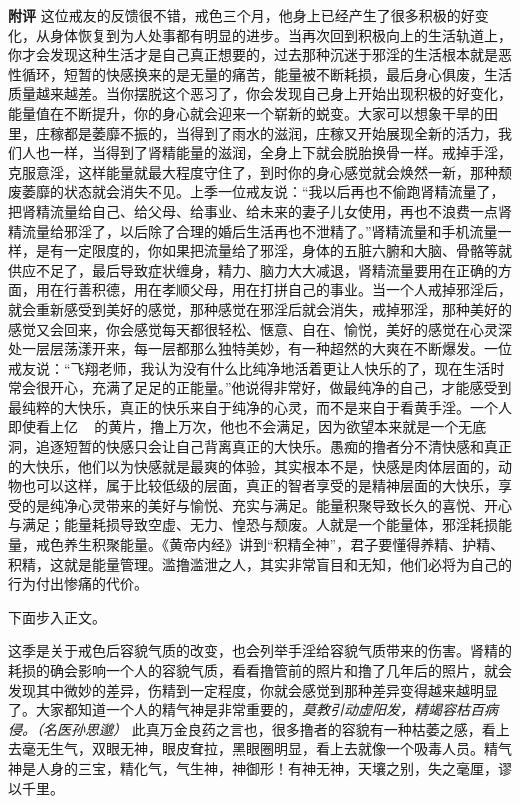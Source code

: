 \begin{case}
    \textbf{附评} 这位戒友的反馈很不错，戒色三个月，他身上已经产生了很多积极的好变化，从身体恢复到为人处事都有明显的进步。当再次回到积极向上的生活轨道上，你才会发现这种生活才是自己真正想要的，过去那种沉迷于邪淫的生活根本就是恶性循环，短暂的快感换来的是无量的痛苦，能量被不断耗损，最后身心俱废，生活质量越来越差。当你摆脱这个恶习了，你会发现自己身上开始出现积极的好变化，能量值在不断提升，你的身心就会迎来一个崭新的蜕变。大家可以想象干旱的田里，庄稼都是萎靡不振的，当得到了雨水的滋润，庄稼又开始展现全新的活力，我们人也一样，当得到了肾精能量的滋润，全身上下就会脱胎换骨一样。戒掉手淫，克服意淫，这样能量就最大程度守住了，到时你的身心感觉就会焕然一新，那种颓废萎靡的状态就会消失不见。上季一位戒友说：“我以后再也不偷跑肾精流量了，把肾精流量给自己、给父母、给事业、给未来的妻子儿女使用，再也不浪费一点肾精流量给邪淫了，以后除了合理的婚后生活再也不泄精了。”肾精流量和手机流量一样，是有一定限度的，你如果把流量给了邪淫，身体的五脏六腑和大脑、骨骼等就供应不足了，最后导致症状缠身，精力、脑力大大减退，肾精流量要用在正确的方面，用在行善积德，用在孝顺父母，用在打拼自己的事业。当一个人戒掉邪淫后，就会重新感受到美好的感觉，那种感觉在邪淫后就会消失，戒掉邪淫，那种美好的感觉又会回来，你会感觉每天都很轻松、惬意、自在、愉悦，美好的感觉在心灵深处一层层荡漾开来，每一层都那么独特美妙，有一种超然的大爽在不断爆发。一位戒友说：“飞翔老师，我认为没有什么比纯净地活着更让人快乐的了，现在生活时常会很开心，充满了足足的正能量。”他说得非常好，做最纯净的自己，才能感受到最纯粹的大快乐，真正的快乐来自于纯净的心灵，而不是来自于看黄手淫。一个人即使看上亿 \unit{\giga\byte} 的黄片，撸上万次，他也不会满足，因为欲望本来就是一个无底洞，追逐短暂的快感只会让自己背离真正的大快乐。愚痴的撸者分不清快感和真正的大快乐，他们以为快感就是最爽的体验，其实根本不是，快感是肉体层面的，动物也可以这样，属于比较低级的层面，真正的智者享受的是精神层面的大快乐，享受的是纯净心灵带来的美好与愉悦、充实与满足。能量积聚导致长久的喜悦、开心与满足；能量耗损导致空虚、无力、惶恐与颓废。人就是一个能量体，邪淫耗损能量，戒色养生积聚能量。《黄帝内经》讲到“积精全神”，君子要懂得养精、护精、积精，这就是能量管理。滥撸滥泄之人，其实非常盲目和无知，他们必将为自己的行为付出惨痛的代价。
\end{case}

下面步入正文。

这季是关于戒色后容貌气质的改变，也会列举手淫给容貌气质带来的伤害。肾精的耗损的确会影响一个人的容貌气质，看看撸管前的照片和撸了几年后的照片，就会发现其中微妙的差异，伤精到一定程度，你就会感觉到那种差异变得越来越明显了。大家都知道一个人的精气神是非常重要的，\textit{莫教引动虚阳发，精竭容枯百病侵。（名医孙思邈）} 此真万金良药之言也，很多撸者的容貌有一种枯萎之感，看上去毫无生气，双眼无神，眼皮耷拉，黑眼圈明显，看上去就像一个吸毒人员。精气神是人身的三宝，精化气，气生神，神御形！有神无神，天壤之别，失之毫厘，谬以千里。

